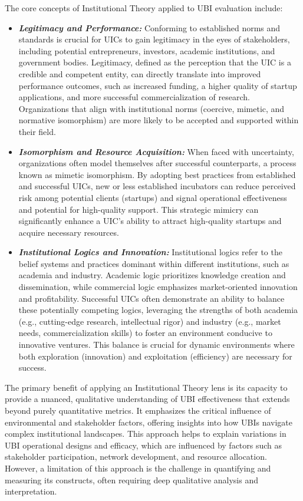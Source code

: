 \documentclass[../Main.tex]{subfiles}
\begin{document}
The core concepts of Institutional Theory applied to UBI evaluation include:
\begin{itemize}
    \item \emph{\textbf{Legitimacy and Performance:}} Conforming to established norms and standards is crucial for UICs to gain legitimacy in the eyes of stakeholders, including potential entrepreneurs, investors, academic institutions, and government bodies. Legitimacy, defined as the perception that the UIC is a credible and competent entity, can directly translate into improved performance outcomes, such as increased funding, a higher quality of startup applications, and more successful commercialization of research. Organizations that align with institutional norms (coercive, mimetic, and normative isomorphism) are more likely to be accepted and supported within their field.

    \item \emph{\textbf{Isomorphism and Resource Acquisition:}} When faced with uncertainty, organizations often model themselves after successful counterparts, a process known as mimetic isomorphism. By adopting best practices from established and successful UICs, new or less established incubators can reduce perceived risk among potential clients (startups) and signal operational effectiveness and potential for high-quality support. This strategic mimicry can significantly enhance a UIC's ability to attract high-quality startups and acquire necessary resources.

    \item \emph{\textbf{Institutional Logics and Innovation:}} Institutional logics refer to the belief systems and practices dominant within different institutions, such as academia and industry. Academic logic prioritizes knowledge creation and dissemination, while commercial logic emphasizes market-oriented innovation and profitability. Successful UICs often demonstrate an ability to balance these potentially competing logics, leveraging the strengths of both academia (e.g., cutting-edge research, intellectual rigor) and industry (e.g., market needs, commercialization skills) to foster an environment conducive to innovative ventures. This balance is crucial for dynamic environments where both exploration (innovation) and exploitation (efficiency) are necessary for success.
\end{itemize}

The primary benefit of applying an Institutional Theory lens is its capacity to provide a nuanced, qualitative understanding of UBI effectiveness that extends beyond purely quantitative metrics. It emphasizes the critical influence of environmental and stakeholder factors, offering insights into how UBIs navigate complex institutional landscapes. This approach helps to explain variations in UBI operational designs and efficacy, which are influenced by factors such as stakeholder participation, network development, and resource allocation. However, a limitation of this approach is the challenge in quantifying and measuring its constructs, often requiring deep qualitative analysis and interpretation.
\end{document}
